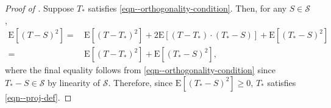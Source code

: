 \documentclass[12pt]{article}
\numberwithin{equation}{section}
\theoremstyle{definition}
\theoremstyle{plain}
\begin{document}
\begin{proof}[Proof of ]
Suppose \(T_{\ast}\) satisfies \eqref{eqn--orthogonality-condition}.
Then, for any \(S \in \mathcal{S}\),
\begin{align*}
  \mathrm{E} \left[ (T - S)^{2} \right] =
  & \, \mathrm{E} \left[ \left( T - T_{\ast} \right)^{2} \right] + 2 \mathrm{E}
  \left[ \left( T - T_{\ast} \right) \cdot \left( T_{\ast} - S \right) \right] +
  \mathrm{E} \left[ \left( T_{\ast} - S \right)^{2} \right] \\
  =
  & \, \mathrm{E} \left[ \left( T - T_{\ast} \right)^{2} \right] + \mathrm{E}
  \left[ \left( T_{\ast} - S \right)^{2} \right],
\end{align*}
where the final equality follows from \eqref{eqn--orthogonality-condition} since
\(T_{\ast} - S \in \mathcal{S}\) by linearity of \(\mathcal{S}\).
Therefore, since \(\mathrm{E} \left[ \left( T_{\ast} - S \right)^{2} \right]
\geq 0\), \(T_{\ast}\) satisfies \eqref{eqn--proj-def}.


\end{proof}
\end{document}
